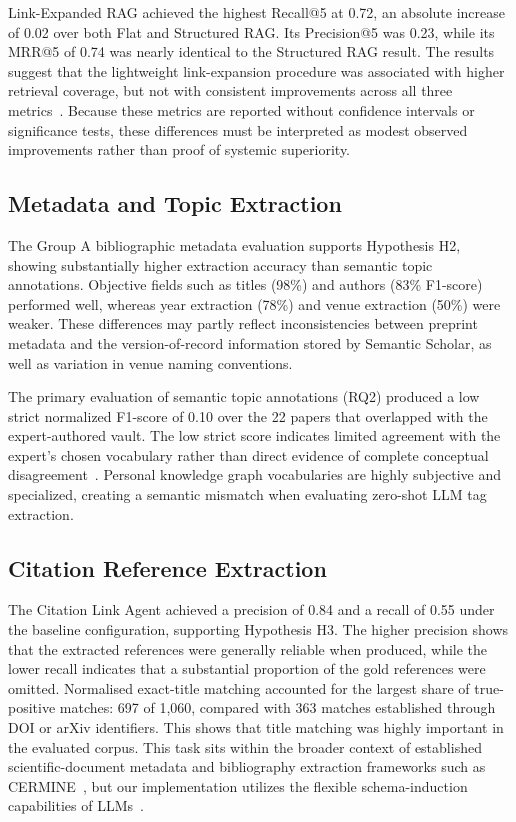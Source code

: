 \documentclass[runningheads]{llncs}
\begin{document}
Link-Expanded RAG achieved the highest Recall@5 at 0.72, an absolute increase of 0.02 over both Flat and Structured RAG. Its Precision@5 was 0.23, while its MRR@5 of 0.74 was nearly identical to the Structured RAG result. The results suggest that the lightweight link-expansion procedure was associated with higher retrieval coverage, but not with consistent improvements across all three metrics~\cite{edge2024local,gutierrez2024hipporag}. Because these metrics are reported without confidence intervals or significance tests, these differences must be interpreted as modest observed improvements rather than proof of systemic superiority.

\subsection{Metadata and Topic Extraction}
The Group A bibliographic metadata evaluation supports Hypothesis H2, showing substantially higher extraction accuracy than semantic topic annotations. Objective fields such as titles (98\%) and authors (83\% F1-score) performed well, whereas year extraction (78\%) and venue extraction (50\%) were weaker. These differences may partly reflect inconsistencies between preprint metadata and the version-of-record information stored by Semantic Scholar, as well as variation in venue naming conventions.

The primary evaluation of semantic topic annotations (RQ2) produced a low strict normalized F1-score of 0.10 over the 22 papers that overlapped with the expert-authored vault. The low strict score indicates limited agreement with the expert’s chosen vocabulary rather than direct evidence of complete conceptual disagreement~\cite{furnas1987vocabulary,balog2019personal}. Personal knowledge graph vocabularies are highly subjective and specialized, creating a semantic mismatch when evaluating zero-shot LLM tag extraction.

\subsection{Citation Reference Extraction}
The Citation Link Agent achieved a precision of 0.84 and a recall of 0.55 under the baseline configuration, supporting Hypothesis H3. The higher precision shows that the extracted references were generally reliable when produced, while the lower recall indicates that a substantial proportion of the gold references were omitted. Normalised exact-title matching accounted for the largest share of true-positive matches: 697 of 1,060, compared with 363 matches established through DOI or arXiv identifiers. This shows that title matching was highly important in the evaluated corpus. This task sits within the broader context of established scientific-document metadata and bibliography extraction frameworks such as CERMINE~\cite{tkaczyk2015cermine}, but our implementation utilizes the flexible schema-induction capabilities of LLMs~\cite{xu2024large}.
\end{document}
